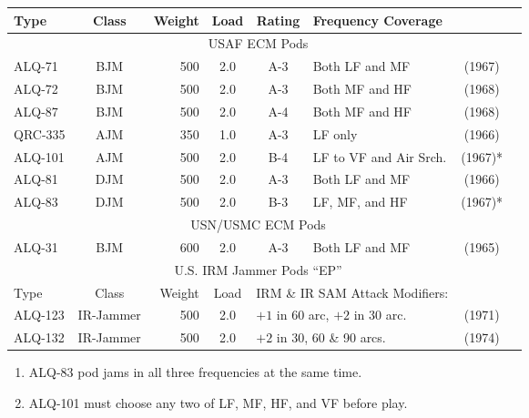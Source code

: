 \begin{twocolumntable}
\begin{tabular}{lcrcclcc}
\toprule
Type&Class&Weight&Load&Rating&Frequency Coverage&\\
\midrule
\multicolumn{7}{c}{USAF ECM Pods}\\
\midrule
ALQ-71 &BJM&500&2.0&A-3&Both LF and MF&(1967)\phantom{*}\\
ALQ-72 &BJM&500&2.0&A-3&Both MF and HF&(1968)\phantom{*}\\
ALQ-87 &BJM&500&2.0&A-4&Both MF and HF&(1968)\phantom{*}\\
QRC-335&AJM&350&1.0&A-3&LF only       &(1966)\phantom{*}\\ 
ALQ-101&AJM&500&2.0&B-4&LF to VF and Air Srch.&(1967)*\\ 
ALQ-81 &DJM&500&2.0&A-3&Both LF and MF&(1966)\phantom{*}\\
ALQ-83 &DJM&500&2.0&B-3&LF, MF, and HF&(1967)*\\
\midrule
\multicolumn{7}{c}{USN/USMC ECM Pods}\\
\midrule
ALQ-31 &BJM&600&2.0&A-3&Both LF and MF&(1965)\\
\midrule
\multicolumn{7}{c}{U.S. IRM Jammer Pods “EP”}\\
\midrule
Type&Class&Weight&Load&\multicolumn{2}{l}{IRM \& IR SAM Attack Modifiers:}&\\
\midrule
ALQ-123&IR-Jammer&500&2.0&\multicolumn{2}{l}{$+1$ in 60 arc, $+2$ in 30 arc.}&(1971)\\
ALQ-132&IR-Jammer&500&2.0&\multicolumn{2}{l}{$+2$ in 30, 60 \& 90 arcs.}&(1974)\\
\bottomrule
\end{tabular}
\begin{tablenote}{0.75\linewidth}
\begin{enumerate}[nosep]
    \item ALQ-83 pod jams in all three frequencies at the same time.
    \item ALQ-101 must choose any two of LF, MF, HF, and VF before play.
\end{enumerate}
\end{tablenote}
\end{twocolumntable}